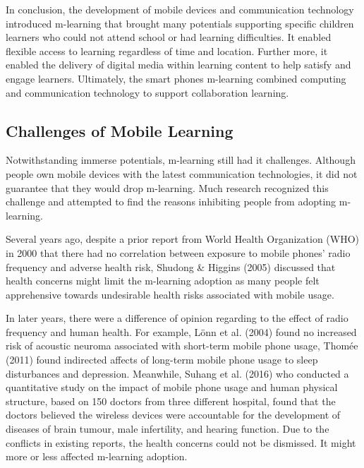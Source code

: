 In conclusion, the development of mobile devices and communication technology introduced m-learning that brought many potentials supporting specific children learners who could not attend school or had learning difficulties. It enabled flexible access to learning regardless of time and location. Further more, it enabled the delivery of digital media within learning content to help satisfy and engage learners. Ultimately, the smart phones m-learning combined computing and communication technology to support collaboration learning. 

 

\subsection{Challenges of Mobile Learning}

Notwithstanding immerse potentials, m-learning still had it challenges. Although people own mobile devices with the latest communication technologies, it did not guarantee that they would drop m-learning. Much research recognized this challenge and attempted to find the reasons inhibiting people from adopting m-learning. 

Several years ago, despite a prior report from World Health Organization (WHO) in 2000 \cite{repacholi2001health} that there had no correlation between exposure to mobile phones' radio frequency and adverse health risk, Shudong \& Higgins (2005) \cite{shudong2005limitations} discussed that health concerns might limit the m-learning adoption as many people felt apprehensive towards undesirable health risks associated with mobile usage. 

In later years, there were a difference of opinion regarding to the effect of radio frequency and human health. For example, L{\"o}nn et al. (2004) \cite{lonn2004mobile} found no increased risk of acoustic neuroma associated with short-term mobile phone usage, Thom{\'e}e (2011) \cite{thomee2011mobile} found indirected affects of long-term mobile phone usage to sleep disturbances and depression. Meanwhile, Suhang et al. (2016) \cite{suhag2016impact} who conducted a quantitative study on the impact of mobile phone usage and human physical structure, based on 150 doctors from three different hospital, found that the doctors believed the wireless devices were accountable for the development of diseases of brain tumour, male infertility, and hearing function. Due to the conflicts in existing reports, the health concerns could not be dismissed. It might more or less affected m-learning adoption. 


